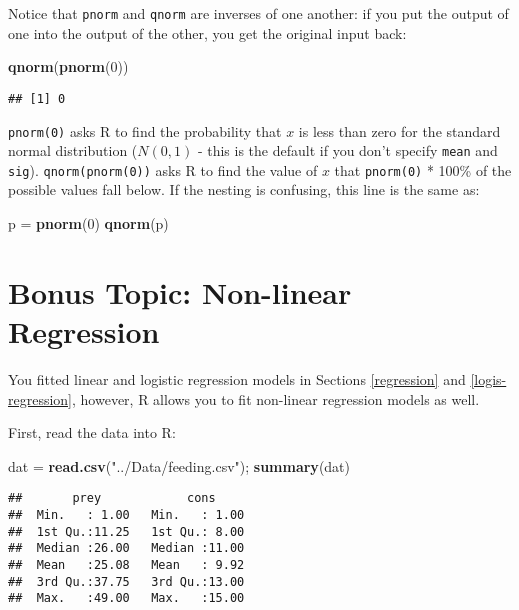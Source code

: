 \documentclass[]{book}
\newenvironment{Shaded}{\begin{snugshade}}{\end{snugshade}}
\newcommand{\KeywordTok}[1]{\textcolor[rgb]{0.13,0.29,0.53}{\textbf{#1}}}
\newcommand{\DecValTok}[1]{\textcolor[rgb]{0.00,0.00,0.81}{#1}}
\newcommand{\StringTok}[1]{\textcolor[rgb]{0.31,0.60,0.02}{#1}}
\newcommand{\NormalTok}[1]{#1}
\theoremstyle{definition}
\theoremstyle{definition}
\theoremstyle{definition}
\theoremstyle{remark}
\begin{document}
Notice that \texttt{pnorm} and \texttt{qnorm} are inverses of one
another: if you put the output of one into the output of the other, you
get the original input back:

\begin{Shaded}
\begin{Highlighting}[]
\KeywordTok{qnorm}\NormalTok{(}\KeywordTok{pnorm}\NormalTok{(}\DecValTok{0}\NormalTok{))}
\end{Highlighting}
\end{Shaded}

\begin{verbatim}
## [1] 0
\end{verbatim}

\texttt{pnorm(0)} asks R to find the probability that \(x\) is less than
zero for the standard normal distribution (\(N(0,1)\) - this is the
default if you don't specify \texttt{mean} and \texttt{sig}).
\texttt{qnorm(pnorm(0))} asks R to find the value of \(x\) that
\texttt{pnorm(0)} * 100\% of the possible values fall below. If the
nesting is confusing, this line is the same as:

\begin{Shaded}
\begin{Highlighting}[]
\NormalTok{p =}\StringTok{ }\KeywordTok{pnorm}\NormalTok{(}\DecValTok{0}\NormalTok{)}
\KeywordTok{qnorm}\NormalTok{(p)}
\end{Highlighting}
\end{Shaded}

\section{Bonus Topic: Non-linear Regression}\label{nls}

You fitted linear and logistic regression models in Sections
\ref{regression} and \ref{logis-regression}, however, R allows you to
fit non-linear regression models as well.

First, read the data into R:

\begin{Shaded}
\begin{Highlighting}[]
\NormalTok{dat =}\StringTok{ }\KeywordTok{read.csv}\NormalTok{(}\StringTok{"../Data/feeding.csv"}\NormalTok{); }\KeywordTok{summary}\NormalTok{(dat)}
\end{Highlighting}
\end{Shaded}

\begin{verbatim}
##       prey            cons      
##  Min.   : 1.00   Min.   : 1.00  
##  1st Qu.:11.25   1st Qu.: 8.00  
##  Median :26.00   Median :11.00  
##  Mean   :25.08   Mean   : 9.92  
##  3rd Qu.:37.75   3rd Qu.:13.00  
##  Max.   :49.00   Max.   :15.00
\end{verbatim}
\end{document}
